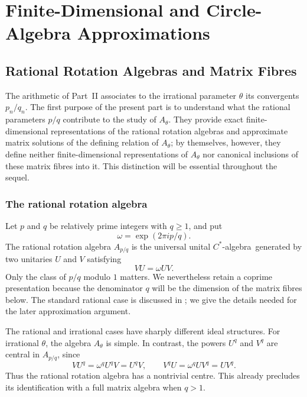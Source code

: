 \documentclass{book}
\def\cstar{\(C^*\)-algebra}
\begin{document}
\part{Finite-Dimensional and Circle-Algebra Approximations}

\chapter{Rational Rotation Algebras and Matrix Fibres}

The arithmetic of Part~II associates to the irrational parameter \(\theta\)
its convergents \(p_n/q_n\).  The first purpose of the present part is to
understand what the rational parameters \(p/q\) contribute to the study of
\(A_\theta\).  They provide exact finite-dimensional representations of the
rational rotation algebras and approximate matrix solutions of the defining
relation of \(A_\theta\); by themselves, however, they define neither
finite-dimensional representations of \(A_\theta\) nor canonical inclusions
of these matrix fibres into it.  This distinction will be essential
throughout the sequel.

\section{The rational rotation algebra}

Let \(p\) and \(q\) be relatively prime integers with \(q\geq1\), and put
\[
  \omega=\exp(2\pi i p/q).
\]
The \textnormal{rational rotation algebra} \(A_{p/q}\) is the universal
unital \cstar\ generated by two unitaries \(U\) and \(V\) satisfying
\begin{equation}\label{eq:RationalRotationRelation}
  VU=\omega UV.
\end{equation}
Only the class of \(p/q\) modulo \(1\) matters.  We nevertheless retain a
coprime presentation because the denominator \(q\) will be the dimension of
the matrix fibres below.  The standard rational case is discussed in
\cite[Chapter~VI, Exercise~VI.1]{Davidson1996}; we give the details needed for
the later approximation argument.

The rational and irrational cases have sharply different ideal structures.
For irrational \(\theta\), the algebra \(A_\theta\) is simple.  In contrast,
the powers \(U^q\) and \(V^q\) are central in \(A_{p/q}\), since
\[
  VU^q=\omega^qU^qV=U^qV,
  \qquad
  V^qU=\omega^qUV^q=UV^q.
\]
Thus the rational rotation algebra has a nontrivial centre.  This already
precludes its identification with a full matrix algebra when \(q>1\).
\end{document}
